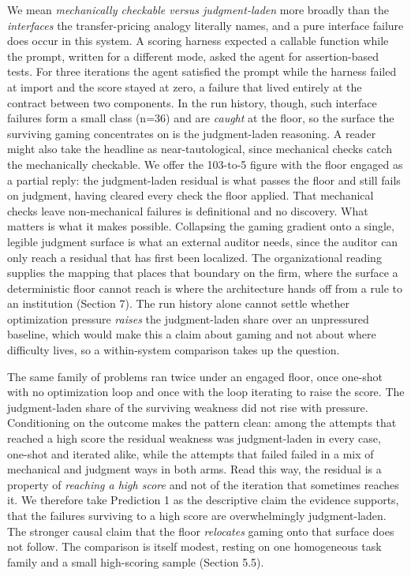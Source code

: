 \documentclass[11pt]{article}
\begin{document}
We mean \emph{mechanically checkable versus judgment-laden} more broadly than the \emph{interfaces} the transfer-pricing analogy literally names, and a pure interface failure does occur in this system. A scoring harness expected a callable function while the prompt, written for a different mode, asked the agent for assertion-based tests. For three iterations the agent satisfied the prompt while the harness failed at import and the score stayed at zero, a failure that lived entirely at the contract between two components. In the run history, though, such interface failures form a small class (n=36) and are \emph{caught} at the floor, so the surface the surviving gaming concentrates on is the judgment-laden reasoning. A reader might also take the headline as near-tautological, since mechanical checks catch the mechanically checkable. We offer the 103-to-5 figure with the floor engaged as a partial reply: the judgment-laden residual is what passes the floor and still fails on judgment, having cleared every check the floor applied. That mechanical checks leave non-mechanical failures is definitional and no discovery. What matters is what it makes possible. Collapsing the gaming gradient onto a single, legible judgment surface is what an external auditor needs, since the auditor can only reach a residual that has first been localized. The organizational reading supplies the mapping that places that boundary on the firm, where the surface a deterministic floor cannot reach is where the architecture hands off from a rule to an institution (Section 7). The run history alone cannot settle whether optimization pressure \emph{raises} the judgment-laden share over an unpressured baseline, which would make this a claim about gaming and not about where difficulty lives, so a within-system comparison takes up the question.

The same family of problems ran twice under an engaged floor, once one-shot with no optimization loop and once with the loop iterating to raise the score. The judgment-laden share of the surviving weakness did not rise with pressure. Conditioning on the outcome makes the pattern clean: among the attempts that reached a high score the residual weakness was judgment-laden in every case, one-shot and iterated alike, while the attempts that failed failed in a mix of mechanical and judgment ways in both arms. Read this way, the residual is a property of \emph{reaching a high score} and not of the iteration that sometimes reaches it. We therefore take Prediction 1 as the descriptive claim the evidence supports, that the failures surviving to a high score are overwhelmingly judgment-laden. The stronger causal claim that the floor \emph{relocates} gaming onto that surface does not follow. The comparison is itself modest, resting on one homogeneous task family and a small high-scoring sample (Section 5.5).
\end{document}
